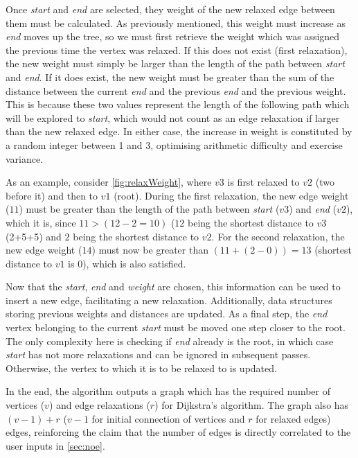 \documentclass{l4proj}
\begin{document}
Once \emph{start} and \emph{end} are selected, they weight of the new relaxed edge between them must be calculated. As previously mentioned, this weight must increase as \emph{end} moves up the tree, so we must first retrieve the weight which was assigned the previous time the vertex was relaxed. If this does not exist (first relaxation), the new weight must simply be larger than the length of the path between \emph{start} and \emph{end}. If it does exist, the new weight must be greater than the sum of the distance between the current \emph{end} and the previous \emph{end} and the previous weight. This is because these two values represent the length of the following path which will be explored to \emph{start}, which would not count as an edge relaxation if larger than the new relaxed edge. In either case, the increase in weight is constituted by a random integer between 1 and 3, optimising arithmetic difficulty and exercise variance.

As an example, consider \autoref{fig:relaxWeight}, where $v3$ is first relaxed to $v2$ (two before it) and then to $v1$ (root). During the first relaxation, the new edge weight ($11$) must be greater than the length of the path between \emph{start} ($v3$) and \emph{end} ($v2$), which it is, since $11 > (12 - 2 = 10)$ ($12$ being the shortest distance to $v3$ (2+5+5) and $2$ being the shortest distance to $v2$. For the second relaxation, the new edge weight ($14$) must now be greater than $(11 + (2-0)) = 13$ (shortest distance to $v1$ is $0$), which is also satisfied.

Now that the \emph{start}, \emph{end} and \emph{weight} are chosen, this information can be used to insert a new edge, facilitating a new relaxation. Additionally, data structures storing previous weights and distances are updated. As a final step, the \emph{end} vertex belonging to the current \emph{start} must be moved one step closer to the root. The only complexity here is checking if \emph{end} already is the root, in which case \emph{start} has not more relaxations and can be ignored in subsequent passes. Otherwise, the vertex to which it is to be relaxed to is updated.

In the end, the algorithm outputs a graph which has the required number of vertices ($v$) and edge relaxations ($r$) for Dijkstra's algorithm. The graph also has $(v-1) + r$ ($v-1$ for initial connection of vertices and $r$ for relaxed edges) edges, reinforcing the claim that the number of edges is directly correlated to the user inputs in \autoref{sec:noe}.
\end{document}
